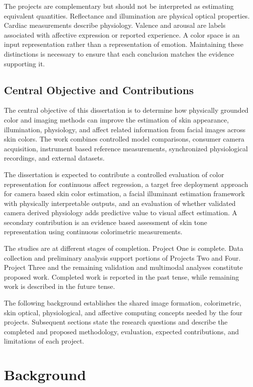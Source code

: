 \documentclass[12pt]{article}
\begin{document}
The projects are complementary but should not be interpreted as estimating equivalent quantities. Reflectance and illumination are physical optical properties. Cardiac measurements describe physiology. Valence and arousal are labels associated with affective expression or reported experience. A color space is an input representation rather than a representation of emotion. Maintaining these distinctions is necessary to ensure that each conclusion matches the evidence supporting it.

\subsection{Central Objective and Contributions}

The central objective of this dissertation is to determine how physically grounded color and imaging methods can improve the estimation of skin appearance, illumination, physiology, and affect related information from facial images across skin colors. The work combines controlled model comparisons, consumer camera acquisition, instrument based reference measurements, synchronized physiological recordings, and external datasets.

The dissertation is expected to contribute a controlled evaluation of color representation for continuous affect regression, a target free deployment approach for camera based skin color estimation, a facial illuminant estimation framework with physically interpretable outputs, and an evaluation of whether validated camera derived physiology adds predictive value to visual affect estimation. A secondary contribution is an evidence based assessment of skin tone representation using continuous colorimetric measurements.

The studies are at different stages of completion. Project One is complete. Data collection and preliminary analysis support portions of Projects Two and Four. Project Three and the remaining validation and multimodal analyses constitute proposed work. Completed work is reported in the past tense, while remaining work is described in the future tense.

The following background establishes the shared image formation, colorimetric, skin optical, physiological, and affective computing concepts needed by the four projects. Subsequent sections state the research questions and describe the completed and proposed methodology, evaluation, expected contributions, and limitations of each project.

\section{Background}
\end{document}
